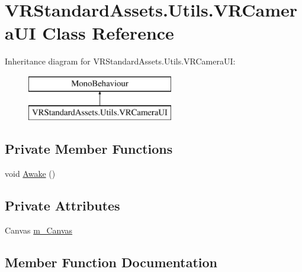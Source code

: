 \hypertarget{class_v_r_standard_assets_1_1_utils_1_1_v_r_camera_u_i}{}\section{V\+R\+Standard\+Assets.\+Utils.\+V\+R\+Camera\+UI Class Reference}
\label{class_v_r_standard_assets_1_1_utils_1_1_v_r_camera_u_i}
Inheritance diagram for V\+R\+Standard\+Assets.\+Utils.\+V\+R\+Camera\+UI\+:\begin{figure}[H]
\begin{center}
\leavevmode
\includegraphics[height=2.000000cm]{class_v_r_standard_assets_1_1_utils_1_1_v_r_camera_u_i}
\end{center}
\end{figure}
\subsection*{Private Member Functions}
\begin{DoxyCompactItemize}
\item 
void \mbox{\hyperlink{class_v_r_standard_assets_1_1_utils_1_1_v_r_camera_u_i_a97c31c7ee563db0395bf6c970f0e88aa}{Awake}} ()
\end{DoxyCompactItemize}
\subsection*{Private Attributes}
\begin{DoxyCompactItemize}
\item 
Canvas \mbox{\hyperlink{class_v_r_standard_assets_1_1_utils_1_1_v_r_camera_u_i_afef7aad14b8afe269014143749aa2622}{m\+\_\+\+Canvas}}
\end{DoxyCompactItemize}


\subsection{Member Function Documentation}
\mbox{\label{class_v_r_standard_assets_1_1_utils_1_1_v_r_camera_u_i_a97c31c7ee563db0395bf6c970f0e88aa}} 
